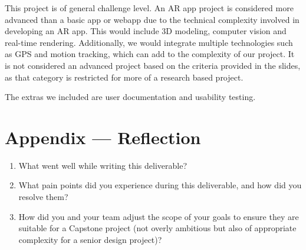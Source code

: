\documentclass{article}
\begin{document}
This project is of general challenge level. An AR app project is considered more advanced than a basic app or webapp due to the technical complexity involved in developing an AR app. This would include 3D modeling, computer vision and real-time rendering. Additionally, we would integrate multiple technologies such as GPS and motion tracking, which can add to the complexity of our project. It is not considered an advanced project based on the criteria provided in the slides, as that category is restricted for more of a research based project.

The extras we included are user documentation and usability testing.

\newpage{}

\section*{Appendix --- Reflection}




\begin{enumerate}
    \item What went well while writing this deliverable? 
    \item What pain points did you experience during this deliverable, and how
    did you resolve them?
    \item How did you and your team adjust the scope of your goals to ensure
    they are suitable for a Capstone project (not overly ambitious but also of
    appropriate complexity for a senior design project)?
\end{enumerate}  
\end{document}
